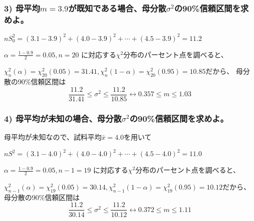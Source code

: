 \documentclass{jsarticle}
\begin{document}
    \subsubsection*{3) 母平均$m = 3.9$が既知である場合、母分散$\sigma ^2$の90\%信頼区間を求めよ。}
        $nS_0^2=(3.1-3.9)^2+(4.0-3.9)^2+\cdots +(4.5-3.9)^2=11.2$

        $\displaystyle\alpha = \frac{1 - 0.9}{2} = 0.05, n=20$
        に対応する$\chi ^2$分布のパーセント点を調べると、

        $\chi_n^2(\alpha)=\chi_{20}^2(0.05)=31.41, \chi_n^2(1-\alpha)=\chi_{20}^2(0.95)=10.85$だから、
        母分散の90\%信頼区間は
        \begin{equation*}
            \frac{11.2}{31.41} \leq \sigma^2 \leq \frac{11.2}{10.85}
            \leftrightarrow 0.357 \leq m \leq 1.03
        \end{equation*}

    \subsubsection*{4) 母平均が未知の場合、母分散$\sigma ^2$の90\%信頼区間を求めよ。}
        母平均が未知なので、試料平均$\bar{x}=4.0$を用いて

        $nS^2=(3.1-4.0)^2+(4.0-4.0)^2+\cdots +(4.5-4.0)^2=11.0$

        $\displaystyle\alpha = \frac{1 - 0.9}{2} = 0.05, n-1=19$
        に対応する$\chi ^2$分布のパーセント点を調べると、

        $\chi_{n-1}^2(\alpha)=\chi_{19}^2(0.05)=30.14, \chi_{n-1}^2(1-\alpha)=\chi_{19}^2(0.95)=10.12$だから、
        母分散の90\%信頼区間は
        \begin{equation*}
            \frac{11.2}{30.14} \leq \sigma^2 \leq \frac{11.2}{10.12}
            \leftrightarrow 0.372 \leq m \leq 1.11
        \end{equation*}
\end{document}
